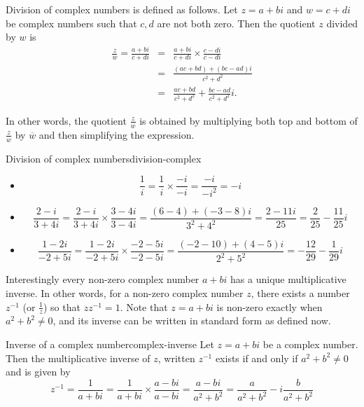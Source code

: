 Division of complex numbers is defined as follows. Let $z=a+bi$ and $w=c+di$ be complex numbers such that $c,d$ are not both zero. Then the quotient $z$ divided by $w$ is
\begin{eqnarray*}
\frac{z}{w}=
\frac{a+bi}{c+di} & = & \frac{a+bi}{c+di}\times \frac{c-di}{c-di} \\
& = & \frac{(ac+bd)+(bc-ad)i}{c^2+d^2} \\
& = & \frac{ac+bd}{c^2+d^2} +\frac{bc-ad}{c^2+d^2}i.
\end{eqnarray*}

In other words, the quotient $\frac{z}{w}$ is obtained by multiplying
both top and bottom of $\frac{z}{w}$ by $\overline{w}$ and
then simplifying the expression.

\begin{example}{Division of complex numbers}{division-complex}
\begin{itemize}
\item
\[ \frac{1}{i} = \frac{1}{i}\times \frac{-i}{-i}
=\frac{-i}{-i^2}=-i \]

\item
\[ \frac{2-i}{3+4i} = \frac{2-i}{3+4i}\times \frac{3-4i}{3-4i}
=\frac{(6-4)+(-3-8)i}{3^2+4^2}
=\frac{2-11i}{25}
=\frac{2}{25} - \frac{11}{25}i \]

\item

\[ \frac{1-2i}{-2+5i} = \frac{1-2i}{-2+5i}\times \frac{-2-5i}{-2-5i}
=\frac{(-2-10) + (4-5)i}{2^2+5^2}
=-\frac{12}{29}-\frac{1}{29}i  \]
\end{itemize}
\end{example}

Interestingly every non-zero complex number $a+bi$ has a unique
multiplicative inverse. In other words, for a non-zero complex number
$z$, there exists a number $z^{-1}$ (or $\frac{1}{z}$) so that
$zz^{-1} = 1$. Note that $z=a+bi$ is non-zero exactly when
$a^{2}+b^{2}\neq 0$, and its inverse can be written in standard form as defined now. 

\begin{definition}{Inverse of a complex number}{complex-inverse}
Let $z = a+bi$ be a complex number. Then the multiplicative inverse of $z$, written $z^{-1}$ exists if and only if $a^{2}+b^{2}\neq 0$ and is given by 
\begin{equation*}
z^{-1} = \frac{1}{a+bi}  = \frac{1}{a+bi}\times \frac{a-bi}{a-bi}=\frac{a-bi}{a^{2}+b^{2}}=\frac{a}{a^{2}+b^{2}}-i\frac{b}{
a^{2}+b^{2}}
\end{equation*}
\end{definition}


